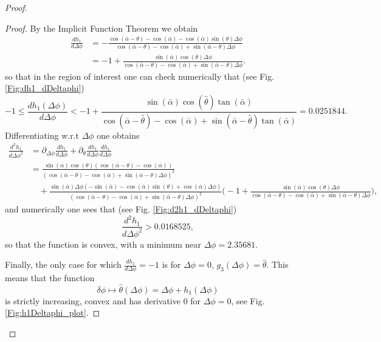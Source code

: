 \documentclass[reqno]{amsart}
\theoremstyle{definition} \newtheorem{definition}{Definition}[section]
\theoremstyle{definition} \newtheorem{remark}[definition]{Remark}
\theoremstyle{plain} \newtheorem{lemma}[definition]{Lemma}
\theoremstyle{plain} \newtheorem{proposition}[definition]{Proposition}
\theoremstyle{plain} \newtheorem{theorem}[definition]{Theorem}
\theoremstyle{plain} \newtheorem{corollary}[definition]{Corollary}
\theoremstyle{definition} \newtheorem{example}[definition]{Example}
\theoremstyle{plain} \newtheorem{claim}[clai]{Claim}
\theoremstyle{definition} \newtheorem{assumption}[definition]{Assumption}
\theoremstyle{definition} \newtheorem{observation}[definition]{Observation}
\newcommand{\1}{\mathbbm 1}
\numberwithin{equation}{section} %
\theoremstyle{plain} \newtheorem*{theorem*}{Theorem}
\theoremstyle{plain} \newtheorem{mthm}[maintheorem]{Main Theorem}
\theoremstyle{plain} \newtheorem*{mthm*}{Main Theorem}
\theoremstyle{plain} \newtheorem*{conjecture*}{Conjecture}
\theoremstyle{plain} \newtheorem{conjecture}[definition]{Conjecture}
\theoremstyle{plain} \newtheorem*{problem*}{Problem}
\begin{document}
\begin{proof}
\begin{proof}
By the Implicit Function Theorem we obtain
\begin{equation}
\label{Equa:dh1_dDeltaphi}
\begin{split}
\frac{dh_1}{d\Delta \phi} &= - \frac{\cos(\bar \alpha - \theta) - \cos(\bar \alpha) - \cos(\bar \alpha) \sin(\theta) \Delta \phi}{\cos(\bar \alpha - \theta) - \cos(\bar \alpha) + \sin(\bar \alpha - \theta) \Delta \phi} \\
&= - 1 + \frac{\sin(\bar \alpha) \cos(\theta) \Delta \phi}{\cos(\bar \alpha - \theta) - \cos(\bar \alpha) + \sin(\bar \alpha - \theta) \Delta \phi}.
\end{split}
\end{equation}
so that in the region of interest one can check numerically that (see Fig. \ref{Fig:dh1_dDeltaphi})
\begin{equation*}
-1 \leq \frac{dh_1(\Delta \phi)}{d\Delta \phi} < - 1 + \frac{\sin(\bar \alpha) \cos(\hat \theta) \tan(\bar \alpha)}{\cos(\bar \alpha - \hat \theta) - \cos(\bar \alpha) + \sin(\bar \alpha - \hat \theta) \tan(\bar \alpha)} = 0.0251844.
\end{equation*}
Differentiating w.r.t $\Delta \phi$ one obtains
\begin{equation}
\label{Equa:d2h1_dDeltaphi}
\begin{split}
\frac{d^2h_1}{d\Delta \phi^2} &= \partial_{\Delta \phi} \frac{dh_1}{d\Delta \phi} + \partial_{\theta} \frac{dh_1}{d\Delta \phi} \frac{dh_1}{d\Delta \phi} \\
&= \frac{\sin(\bar \alpha) \cos(\theta) (\cos(\bar \alpha - \theta) - \cos(\bar \alpha))}{(\cos(\bar \alpha - \theta) - \cos(\bar \alpha) + \sin(\bar \alpha - \theta) \Delta \phi)^2} \\
& \quad + \frac{\sin(\bar \alpha) \Delta \phi (- \sin(\bar \alpha) - \cos(\bar \alpha) \sin(\theta) + \cos(\bar \alpha) \Delta \phi)}{(\cos(\bar \alpha - \theta) - \cos(\bar \alpha) + \sin(\bar \alpha - \theta) \Delta \phi)^2} \bigg( - 1 + \frac{\sin(\bar \alpha) \cos(\theta) \Delta \phi}{\cos(\bar \alpha - \theta) - \cos(\bar \alpha) + \sin(\bar \alpha - \theta) \Delta \phi} \bigg),
\end{split}
\end{equation}
and numerically one sees that (see Fig. \ref{Fig:d2h1_dDeltaphi})
\begin{equation*}
\frac{d^2 h_1}{d\Delta \phi^2} > 0.0168525,
\end{equation*}
so that the function is convex, with a minimum near $\Delta \phi = 2.35681$.

Finally, the only case for which $\frac{dh_1}{d\Delta \phi} = -1$ is for $\Delta \phi = 0$, $g_3(\Delta \phi) = \hat \theta$. This means that the function
\begin{equation*}
\delta \phi \mapsto \hat \theta(\Delta \phi) = \Delta \phi + h_1(\Delta \phi)
\end{equation*}
is strictly increasing, convex and has derivative $0$ for $\Delta \phi = 0$, see Fig. \ref{Fig:h1Deltaphi_plot}.
\end{proof}


\end{proof}
\end{document}
